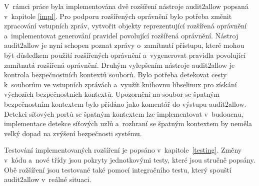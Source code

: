 V~rámci práce byla implementována dvě rozšíření nástroje audit2allow popsaná
v~kapitole \ref{impl}. Pro podporu rozšířených oprávnění bylo potřeba změnit
zpracování vstupních zpráv, vytvořit objekty reprezentující rozšířená oprávnění
a~implementovat generování pravidel povolující rozšířená oprávnění.  Nástroj
audit2allow je nyní schopen poznat zprávy o~zamítnutí přístupu, které mohou být
důsledkem použití rozšířených oprávnění a~vygenerovat pravidla povolující
zamítnutá rozšířená oprávnění. Druhým vylepšením nástroje audit2allow je
kontrola bezpečnostních kontextů souborů. Bylo potřeba detekovat cesty
k~souborům ve vstupních zprávách a~využít knihovnu libselinux pro získání
výchozích bezpečnostních kontextů. Upozornění na soubor se špatným bezpečnostním
kontextem bylo přidáno jako komentář do výstupu audit2allow. Detekci síťových
portů se špatným kontextem lze implementovat v~budoucnu, implementace detekce
síťových uzlů a~rozhraní se špatným kontextem by neměla velký dopad na zvýšení
bezpečnosti systému.

Testování implementovaných rozšíření je popsáno v~kapitole~\ref{testing}. Změny
v~kódu a~nové třídy jsou pokryty jednotkovými testy, které jsou stručně popsány.
Obě rožšíření jsou testované také pomocí integračního testu, který spouští
audit2allow v~reálné situaci.


